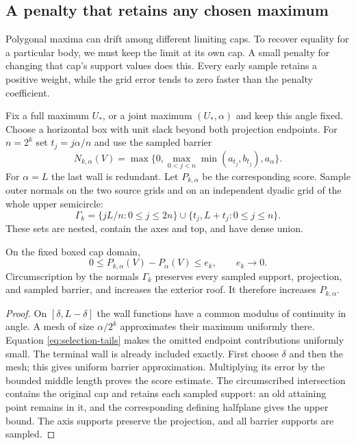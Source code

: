 \subsection{A penalty that retains any chosen maximum}

Polygonal maxima can drift among different limiting caps. To recover
equality for a particular body, we must keep the limit at its own cap.
A small penalty for changing that cap's support values does this. Every
early sample retains a positive weight, while the grid error tends to
zero faster than the penalty coefficient.

Fix a full maximum $U_*$, or a joint maximum $(U_*,\alpha)$ and
keep this angle fixed. Choose a horizontal box with unit slack
beyond both projection endpoints. For $n=2^k$ set
$t_j=j\alpha/n$ and use the sampled barrier
\[
 N_{k,\alpha}(V)=\max\{0,
       \max_{0<j<n}\min(a_{t_j},b_{t_j}),a_\alpha\}.
\]
For $\alpha=L$ the last wall is redundant. Let $P_{k,\alpha}$ be
the corresponding score. Sample outer normals on the two source
grids and on an independent dyadic grid of the whole upper semicircle:
\[
 \Gamma_k=\{jL/n:0\le j\le2n\}
       \cup\{t_j,L+t_j:0\le j\le n\}.
\]
These sets are nested, contain the axes and top, and have dense union.

\begin{lemma}\label{lem:selection-grid}
On the fixed boxed cap domain,
\[
 0\le P_{k,\alpha}(V)-P_\alpha(V)\le e_k,
 \qquad e_k\longrightarrow0.
\]
Circumscription by the normals $\Gamma_k$ preserves every sampled
support, projection, and sampled barrier, and increases the exterior
roof. It therefore increases $P_{k,\alpha}$.
\end{lemma}

\begin{proof}
On $[\delta,L-\delta]$ the wall functions have a common modulus of
continuity in angle. A mesh of size $\alpha/2^k$ approximates their
maximum uniformly there. Equation \eqref{eq:selection-tails} makes
the omitted endpoint contributions uniformly small. The terminal
wall is already included exactly. First choose $\delta$ and then
the mesh; this gives uniform barrier approximation. Multiplying
its error by the bounded middle length proves the score estimate.
The circumscribed intersection contains the original cap and retains
each sampled support: an old attaining point remains in it, and the
corresponding defining halfplane gives the upper bound. The axis
supports preserve the projection, and all barrier supports are sampled.
\end{proof}

